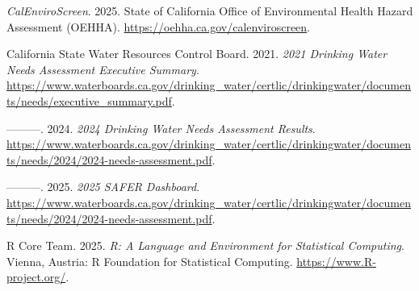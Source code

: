 \documentclass[
  letterpaper,
  DIV=11,
  numbers=noendperiod]{scrartcl}
\newlength{\cslhangindent}
\newenvironment{CSLReferences}[2] %
 {\begin{list}{}{%
  \setlength{\itemindent}{0pt}
  \setlength{\leftmargin}{0pt}
  \setlength{\parsep}{0pt}
  \ifodd #1
   \setlength{\leftmargin}{\cslhangindent}
   \setlength{\itemindent}{-1\cslhangindent}
  \fi
  \setlength{\itemsep}{#2\baselineskip}}}
 {\end{list}}
\begin{document}
\label{refs}
\begin{CSLReferences}{1}{0}
\emph{CalEnviroScreen}. 2025. State of California Office of
Environmental Health Hazard Assessment (OEHHA).
\url{https://oehha.ca.gov/calenviroscreen}.

California State Water Resources Control Board. 2021. \emph{2021
Drinking Water Needs Assessment Executive Summary}.
\url{https://www.waterboards.ca.gov/drinking_water/certlic/drinkingwater/documents/needs/executive_summary.pdf}.

---------. 2024. \emph{2024 Drinking Water Needs Assessment Results}.
\url{https://www.waterboards.ca.gov/drinking_water/certlic/drinkingwater/documents/needs/2024/2024-needs-assessment.pdf}.

---------. 2025. \emph{2025 SAFER Dashboard}.
\url{https://www.waterboards.ca.gov/drinking_water/certlic/drinkingwater/documents/needs/2024/2024-needs-assessment.pdf}.

R Core Team. 2025. \emph{R: A Language and Environment for Statistical
Computing}. Vienna, Austria: R Foundation for Statistical Computing.
\url{https://www.R-project.org/}.

\end{CSLReferences}
\end{document}
